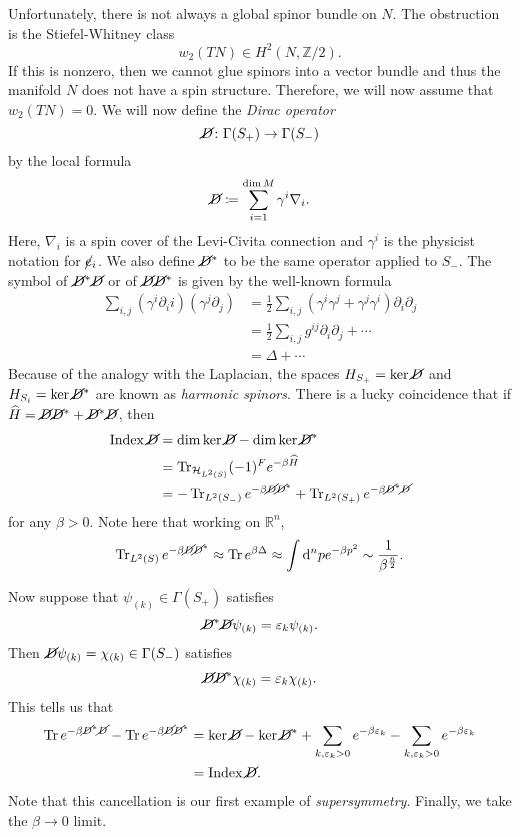 \documentclass[leqno, openany]{memoir}
\theoremstyle{definition}
\theoremstyle{remark}
\theoremstyle{plain}
\theoremstyle{definition}
\theoremstyle{remark}
\newcommand{\R}{\mathbb{R}}
\newcommand{\Z}{\mathbb{Z}}
\newcommand{\ep}{\varepsilon}
\newcommand{\mc}[1]{\mathcal{#1}}
\newcommand{\on}[1]{\operatorname{#1}}
\newcommand{\wh}[1]{\widehat{#1}}
\begin{document}
Unfortunately, there is not always a global spinor bundle on $N$. The obstruction is the Stiefel-Whitney class
\[ w_2(TN) \in H^2(N, \Z/2). \]
If this is nonzero, then we cannot glue spinors into a vector bundle and thus the manifold $N$ does not have a spin structure. Therefore, we will now assume that $w_2(TN) = 0$. We will now define the \textit{Dirac operator}
\[ \cancel{D} \colon \Gamma(S_+) \to \Gamma(S_-) \]
by the local formula
\[ \cancel{D} \coloneqq \sum_{i=1}^{\dim M} \gamma^i \nabla_i. \]
Here, $\nabla_i$ is a spin cover of the Levi-Civita connection and $\gamma^i$ is the physicist notation for $\cancel{e}_i$. We also define $\cancel{D}^*$ to be the same operator applied to $S_-$. The symbol of $\cancel{D}^* \cancel{D}$ or of $\cancel{D} \cancel{D}^*$ is given by the well-known formula
\begin{align*}
  \sum_{i,j} (\gamma^i \partial_ii)(\gamma^j \partial_j) &= \frac{1}{2} \sum_{i,j} (\gamma^i \gamma^j + \gamma^j \gamma^i)\partial_i \partial_j \\
                                                         &= \frac{1}{2} \sum_{i,j} g^{ij} \partial_i \partial_j + \cdots \\
  &= \Delta + \cdots
\end{align*}
Because of the analogy with the Laplacian, the spaces $H_{S_+} = \ker \cancel{D}$ and $H_{S_i} = \ker \cancel{D}^*$ are known as \textit{harmonic spinors}. There is a lucky coincidence that if $\wh{H} = \cancel{D} \cancel{D}^* + \cancel{D}^*\cancel{D}$, then
\begin{align*}
  \on{Index} \cancel{D} &= \dim \ker \cancel{D} - \dim \ker \cancel{D}^* \\
                        &= \Tr_{\mc{H}_{L^2(S)}} (-1)^F e^{-\beta \wh{H}} \\
                        &= -\Tr_{L^2(S_-)} e^{-\beta\cancel{D} \cancel{D}^*} + \Tr_{L^2(S_+)} e^{-\beta \cancel{D}^*\cancel{D}}
\end{align*}
for any $\beta > 0$. Note here that working on $\R^n$,
\[ \Tr_{L^2(S)} e^{-\beta \cancel{D} \cancel{D}^*} \approx \Tr e^{\beta \Delta} \approx\int \dd^n p e^{-\beta p^2} \sim \frac{1}{\beta^{\frac{n}{2}}}. \]

Now suppose that $\psi_{(k)} \in \Gamma(S_+)$ satisfies
\[ \cancel{D}^* \cancel{D} \psi_{(k)} = \ep_k \psi_{(k)}. \]
Then $\cancel{D} \psi_{(k)} = \chi_{(k)} \in \Gamma(S_-)$ satisfies
\[ \cancel{D} \cancel{D}^* \chi_{(k)} = \ep_k \chi_{(k)}. \]
This tells us that
\begin{align*}
  \Tr e^{-\beta\cancel{D}^* \cancel{D}} - \Tr e^{-\beta \cancel{D}\cancel{D}^*} &= \ker \cancel{D} - \ker \cancel{D}^* + \sum_{k,\ep_k > 0} e^{-\beta \ep_k} - \sum_{k,\ep_k > 0} e^{-\beta \ep_k} \\
                                                                                &= \on{Index} \cancel{D}.
\end{align*}
Note that this cancellation is our first example of \textit{supersymmetry}. Finally, we take the $\beta \to 0$ limit.
\end{document}
